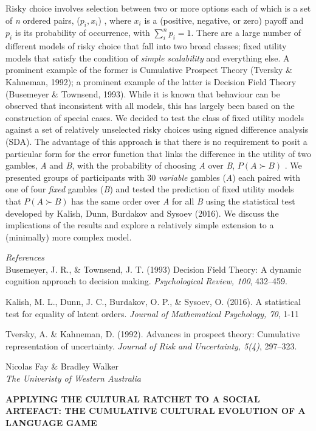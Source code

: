 \documentclass[]{article}
\begin{document}
Risky choice involves selection between two or more options each of
which is a set of \emph{n} ordered pairs, (\(p_i,x_i\)) , where \(x_i\)
is a (positive, negative, or zero) payoff and \(p_i\) is its probability
of occurrence, with \(\sum_i^n p_i=1\). There are a large number of
different models of risky choice that fall into two broad classes; fixed
utility models that satisfy the condition of \emph{simple scalability}
and everything else. A prominent example of the former is Cumulative
Prospect Theory (Tversky \& Kahneman, 1992); a prominent example of the
latter is Decision Field Theory (Busemeyer \& Townsend, 1993). While it
is known that behaviour can be observed that inconsistent with all
models, this has largely been based on the construction of special
cases. We decided to test the class of fixed utility models against a
set of relatively unselected risky choices using signed difference
analysis (SDA). The advantage of this approach is that there is no
requirement to posit a particular form for the error function that links
the difference in the utility of two gambles, \emph{A} and \emph{B},
with the probability of choosing \emph{A} over \emph{B},
\(P(A \succ B)\) . We presented groups of participants with 30
\emph{variable} gambles (\emph{A}) each paired with one of four
\emph{fixed} gambles (\emph{B}) and tested the prediction of fixed
utility models that \(P(A \succ B)\) has the same order over \emph{A}
for all \emph{B} using the statistical test developed by Kalish, Dunn,
Burdakov and Sysoev (2016). We discuss the implications of the results
and explore a relatively simple extension to a (minimally) more complex
model.

\emph{References}\\
Busemeyer, J. R., \& Townsend, J. T. (1993) Decision Field Theory: A
dynamic cognition approach to decision making. \emph{Psychological
Review, 100}, 432--459.

Kalish, M. L., Dunn, J. C., Burdakov, O. P., \& Sysoev, O. (2016). A
statistical test for equality of latent orders. \emph{Journal of
Mathematical Psychology, 70}, 1-11

Tversky, A. \& Kahneman, D. (1992). Advances in prospect theory:
Cumulative representation of uncertainty. \emph{Journal of Risk and
Uncertainty, 5(4)}, 297--323.\\
\pagebreak  

Nicolas Fay \& Bradley Walker\\
\emph{The Univeristy of Western Australia}

\textbf{APPLYING THE CULTURAL RATCHET TO A SOCIAL ARTEFACT: THE
CUMULATIVE CULTURAL EVOLUTION OF A LANGUAGE GAME}
\end{document}
